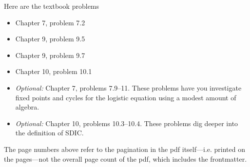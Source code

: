 \documentclass[12pt]{article}
\begin{document}
\noindent Here are the textbook problems

\begin{itemize}
\setlength{\itemsep}{-1mm}
\item Chapter 7, problem 7.2
\item Chapter 9, problem 9.5
\item Chapter 9, problem 9.7
\item Chapter 10, problem 10.1
\item \emph{Optional:} Chapter 7, problems 7.9--11.  These
  problems have you investigate fixed points and cycles for the
  logistic equation using a modest amount of algebra.
\item \emph{Optional:} Chapter 10, problems 10.3--10.4.  These
  problems dig deeper into the definition of SDIC. 
\end{itemize}

The page numbers above refer to the pagination in the pdf
itself---i.e. printed on the pages---not the overall page count of the
pdf, which includes the frontmatter.
\end{document}
